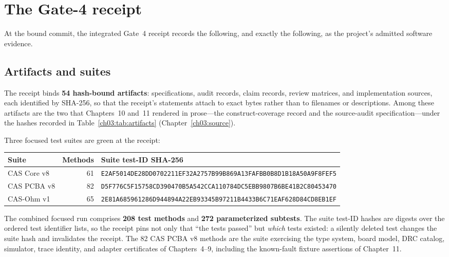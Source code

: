 \section{The Gate-4 receipt}\label{ch12:receipt}

At the bound commit, the integrated Gate~4 receipt records the following, and exactly the following, as the project's admitted software evidence.

\subsection{Artifacts and suites}

The receipt binds \textbf{54 hash-bound artifacts}: specifications, audit records, claim records, review matrices, and implementation sources, each identified by SHA-256, so that the receipt's statements attach to exact bytes rather than to filenames or descriptions. Among these artifacts are the two that Chapters~10 and~11 rendered in prose---the construct-coverage record and the source-audit specification---under the hashes recorded in Table~\ref{ch03:tab:artifacts} (Chapter~\ref{ch03:source}).

Three focused test suites are green at the receipt:

\begin{center}
\small
\begin{tabular}{@{}lrl@{}}
\toprule
Suite & Methods & Suite test-ID SHA-256 \\
\midrule
CAS Core v8 & 61 & \texttt{E2AF5014DE28DD0702211EF32A2757B99B869A13FAFBB0B8D1B18A50A9F8FEF5} \\
CAS PCBA v8 & 82 & \texttt{D5F776C5F15758CD390470B5A542CCA110784DC5EBB9807B6BE41B2C80453470} \\
CAS-Ohm v1 & 65 & \texttt{2E81A685961286D944894A22EB93345B97211B4433B6C71EAF628D84CD8EB1EF} \\
\bottomrule
\end{tabular}
\end{center}

The combined focused run comprises \textbf{208 test methods} and \textbf{272 parameterized subtests}. The suite test-ID hashes are digests over the ordered test identifier lists, so the receipt pins not only that ``the tests passed'' but \emph{which} tests existed: a silently deleted test changes the suite hash and invalidates the receipt. The 82 CAS PCBA v8 methods are the suite exercising the type system, board model, DRC catalog, simulator, trace identity, and adapter certificates of Chapters~4--9, including the known-fault fixture assertions of Chapter~11.

